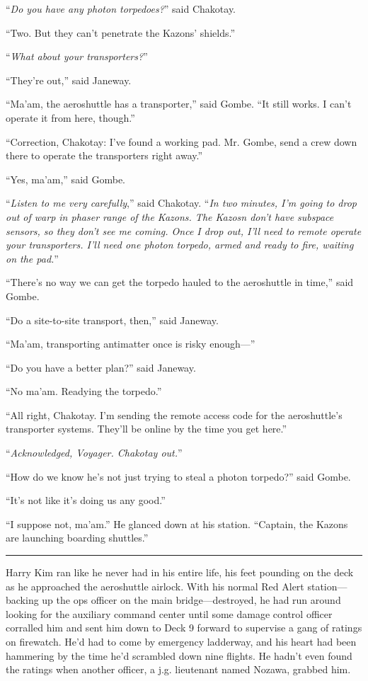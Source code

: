 \documentclass[twoside,letterpaper,12pt]{memoir}
\begin{document}
``\textit{Do you have any photon torpedoes?}'' said Chakotay.

``Two. But they can't penetrate the Kazons' shields.''

``\textit{What about your transporters?}''

``They're out,'' said Janeway.

``Ma'am, the aeroshuttle has a transporter,'' said Gombe. ``It still works. I can't operate it from here, though.''

``Correction, Chakotay: I've found a working pad. Mr. Gombe, send a crew down there to operate the transporters right away.''

``Yes, ma'am,'' said Gombe.

``\textit{Listen to me very carefully},'' said Chakotay. ``\textit{In two minutes, I'm going to drop out of warp in phaser range of the Kazons. The Kazosn don't have subspace sensors, so they don't see me coming. Once I drop out, I'll need to remote operate your transporters. I’ll need one photon torpedo, armed and ready to fire, waiting on the pad.}''

``There's no way we can get the torpedo hauled to the aeroshuttle in time,'' said Gombe.

``Do a site-to-site transport, then,'' said Janeway.

``Ma'am, transporting antimatter once is risky enough---''

``Do you have a better plan?'' said Janeway.

``No ma'am. Readying the torpedo.''

``All right, Chakotay. I'm sending the remote access code for the aeroshuttle's transporter systems. They'll be online by the time you get here.''

``\textit{Acknowledged, Voyager. Chakotay out.}''

``How do we know he's not just trying to steal a photon torpedo?'' said Gombe.

``It's not like it's doing us any good.''

``I suppose not, ma'am.'' He glanced down at his station. ``Captain, the Kazons are launching boarding shuttles.''

\fancybreak{\rule{3cm}{0.4 pt}}
Harry Kim ran like he never had in his entire life, his feet pounding on the deck as he approached the aeroshuttle airlock. With his normal Red Alert station---backing up the ops officer on the main bridge---destroyed, he had run around looking for the auxiliary command center until some damage control officer corralled him and sent him down to Deck 9 forward to supervise a gang of ratings on firewatch. He'd had to come by emergency ladderway, and his heart had been hammering by the time he'd scrambled down nine flights. He hadn't even found the ratings when another officer, a j.g. lieutenant named Nozawa, grabbed him.
\end{document}
